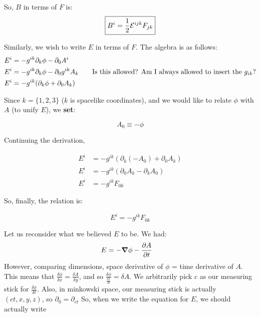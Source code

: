 So, $B$ in terms of $F$ is:
\begin{equation}
    \boxed{B^i = \frac{1}{2} \mathcal{E}^{ijk} F_{jk}}
\end{equation}

Similarly, we wish to write $E$ in terms of $F$. The algebra is as follows:
\begin{align*}
    E^i &= -g^{ik} \partial_k \phi - \partial_0 A^i \\
    E^i &= -g^{ik} \partial_k \phi - \partial_0 g^{ik} A_k  \tag*{Is this allowed? Am I always allowed to insert the $g_{ik}$?} \\
    E^i &= -g^{ik} (\partial_k \phi + \partial_0 A_k) \\
\end{align*}

Since $k = \{1, 2, 3\}$ ($k$ is spacelike coordinates), and we would like to
relate $\phi$ with $A$ (to unify $E$), we \textbf{set}:

\begin{equation}
    \boxed{A_0 \equiv - \phi}
\end{equation}

Continuing the derivation,



\begin{align*}
    E^i &= -g^{ik} (\partial_k (- A_0) + \partial_0 A_k) \\
    E^i &= -g^{ik} (\partial_0 A_k - \partial_k A_0 ) \\
    E^i &= -g^{ik} F_{0k}
\end{align*}


So, finally, the relation is:

\begin{equation}
    \boxed{E^i = -g^{ik} F_{0k}}
\end{equation}


Let us reconsider what we believed $E$ to be. We had:
\begin{align*}
    E &= - \grad \phi - \pdv{A}{t}
\end{align*}
However, comparing dimensions, space derivative of $\phi$ = time
derivative of $A$. This means that 
$\frac{\delta \phi}{\delta x} = \frac{\delta A}{\delta y}$, and so
$\frac{\delta \phi}{\frac{\delta x}{\delta t}} =  \delta A$. We arbitrarily
pick $c$ as our measuring stick for $\frac{\delta x}{\delta t}$.
Also, in minkowski space, our measuring stick is actually $(ct, x, y, z)$,
so $\partial_0 = \partial_{ct}$ So, when we write the equation for $E$, we should actually write

